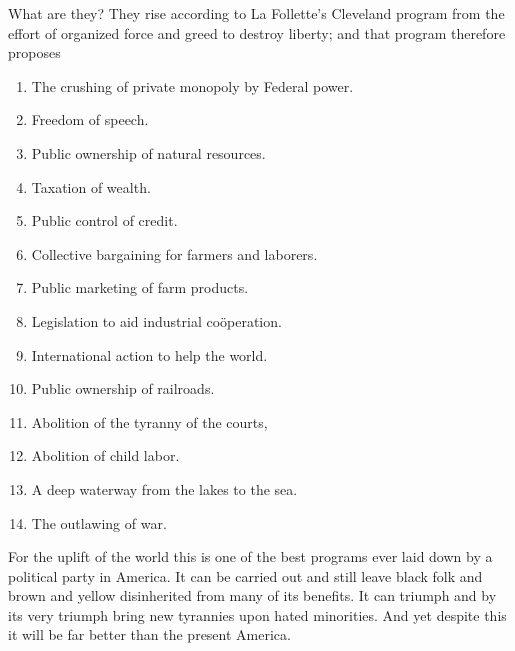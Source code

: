 \documentclass[letterpaper,10pt,english]{jupyterBook}
\begin{document}
\sphinxAtStartPar
What are they? They rise according to La Follette’s Cleveland program from the effort of organized force and greed to destroy liberty; and that program therefore proposes
\begin{enumerate}
%
\item {} 
\sphinxAtStartPar
The crushing of private monopoly by Federal power.

\item {} 
\sphinxAtStartPar
Freedom of speech.

\item {} 
\sphinxAtStartPar
Public ownership of natural resources.

\item {} 
\sphinxAtStartPar
Taxation of wealth.

\item {} 
\sphinxAtStartPar
Public control of credit.

\item {} 
\sphinxAtStartPar
Collective bargaining for farmers and laborers.

\item {} 
\sphinxAtStartPar
Public marketing of farm products.

\item {} 
\sphinxAtStartPar
Legislation to aid industrial coöperation.

\item {} 
\sphinxAtStartPar
International action to help the world.

\item {} 
\sphinxAtStartPar
Public ownership of railroads.

\item {} 
\sphinxAtStartPar
Abolition of the tyranny of the courts,

\item {} 
\sphinxAtStartPar
Abolition of child labor.

\item {} 
\sphinxAtStartPar
A deep waterway from the lakes to the sea.

\item {} 
\sphinxAtStartPar
The outlawing of war.

\end{enumerate}

\sphinxAtStartPar
For the uplift of the world this is one of the best programs ever laid down by a political party in America. It can be carried out and still leave black folk and brown and yellow disinherited from many of its benefits. It can triumph and by its very triumph bring new tyrannies upon hated minorities. And yet despite this it will be far better than the present America.
\end{document}
